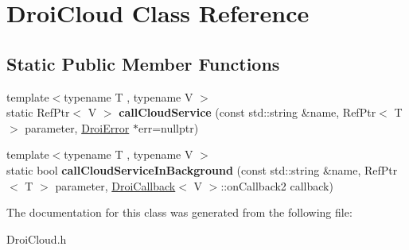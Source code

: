 \hypertarget{class_droi_cloud}{}\section{Droi\+Cloud Class Reference}
\label{class_droi_cloud}
\subsection*{Static Public Member Functions}
\begin{DoxyCompactItemize}
\item 
\mbox{\label{class_droi_cloud_a4a2e1d75768f0165aba8c57fb54cbaf7}} 
{\footnotesize template$<$typename T , typename V $>$ }\\static Ref\+Ptr$<$ V $>$ {\bfseries call\+Cloud\+Service} (const std\+::string \&name, Ref\+Ptr$<$ T $>$ parameter, \hyperlink{class_droi_error}{Droi\+Error} $\ast$err=nullptr)
\item 
\mbox{\label{class_droi_cloud_a28212aaa0cdfcabf123085621db77e8f}} 
{\footnotesize template$<$typename T , typename V $>$ }\\static bool {\bfseries call\+Cloud\+Service\+In\+Background} (const std\+::string \&name, Ref\+Ptr$<$ T $>$ parameter, \hyperlink{struct_droi_callback}{Droi\+Callback}$<$ V $>$\+::on\+Callback2 callback)
\end{DoxyCompactItemize}


The documentation for this class was generated from the following file\+:\begin{DoxyCompactItemize}
\item 
Droi\+Cloud.\+h\end{DoxyCompactItemize}

